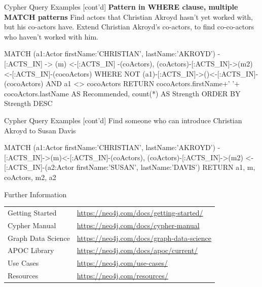 \documentclass[ignorenonframetext,xcolor=x11names]{beamer}
\begin{document}
\begin{frame}[fragile]{Cypher Query Examples \small [cont'd]}
\textbf{Pattern in WHERE clause, multiple MATCH patterns} Find actors that Christian Akroyd hasn't yet worked with, but his co-actors have. Extend Christian Akroyd's co-actors, to find co-co-actors who haven't worked with him.
\footnotesize
\begin{cyphercode}
MATCH (a1:Actor {firstName:'CHRISTIAN', 
                 lastName:'AKROYD'})
      - [:ACTS_IN] -> (m) <-[:ACTS_IN] -(coActors),
  (coActors)-[:ACTS_IN]->(m2)<-[:ACTS_IN]-(cocoActors)
WHERE NOT (a1)-[:ACTS_IN]->()<-[:ACTS_IN]-(cocoActors) 
      AND a1 <> cocoActors
RETURN cocoActors.firstName+' '+
       cocoActors.lastName AS Recommended, 
       count(*) AS Strength 
ORDER BY Strength DESC
\end{cyphercode}
\end{frame}

\begin{frame}[fragile]{Cypher Query Examples \small [cont'd]}
Find someone who can introduce Christian Akroyd to Susan Davis
\footnotesize
\begin{cyphercode}
MATCH (a1:Actor {firstName:'CHRISTIAN', 
                 lastName:'AKROYD'})
          -[:ACTS_IN]->(m)<-[:ACTS_IN]-(coActors),
      (coActors)-[:ACTS_IN]->(m2)
      <-[:ACTS_IN]-(a2:Actor {firstName:'SUSAN', 
                              lastName:'DAVIS'})
RETURN a1, m, coActors, m2, a2
\end{cyphercode}
\end{frame}


\begin{frame}{Further Information}
\renewcommand{\arraystretch}{1.5}
\footnotesize
\begin{tabularx}{\linewidth}{l|X} \hline
Getting Started & \url{https://neo4j.com/docs/getting-started/} \\ 
Cypher Manual & \url{https://neo4j.com/docs/cypher-manual} \\
Graph Data Science & \url{https://neo4j.com/docs/graph-data-science} \\ 
APOC Library & \url{https://neo4j.com/docs/apoc/current/} \\ 
Use Cases & \url{https://neo4j.com/use-cases/} \\
Resources & \url{https://neo4j.com/resources/} \\
\hline
\end{tabularx}
\end{frame}
\end{document}
